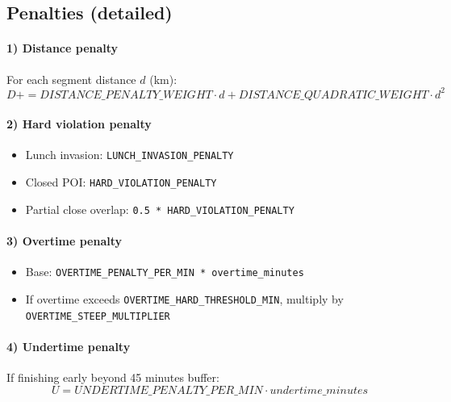 \documentclass[11pt]{article}
\begin{document}
\subsection{Penalties (detailed)}

\paragraph{1) Distance penalty}
For each segment distance $d$ (km):
\[
D += DISTANCE\_PENALTY\_WEIGHT \cdot d + DISTANCE\_QUADRATIC\_WEIGHT \cdot d^2
\]

\paragraph{2) Hard violation penalty}
\begin{itemize}
  \item Lunch invasion: \texttt{LUNCH\_INVASION\_PENALTY}
  \item Closed POI: \texttt{HARD\_VIOLATION\_PENALTY}
  \item Partial close overlap: \texttt{0.5 * HARD\_VIOLATION\_PENALTY}
\end{itemize}

\paragraph{3) Overtime penalty}
\begin{itemize}
  \item Base: \texttt{OVERTIME\_PENALTY\_PER\_MIN * overtime\_minutes}
  \item If overtime exceeds \texttt{OVERTIME\_HARD\_THRESHOLD\_MIN}, multiply by \texttt{OVERTIME\_STEEP\_MULTIPLIER}
\end{itemize}

\paragraph{4) Undertime penalty}
If finishing early beyond 45 minutes buffer:
\[
U = UNDERTIME\_PENALTY\_PER\_MIN \cdot undertime\_minutes
\]
\end{document}
